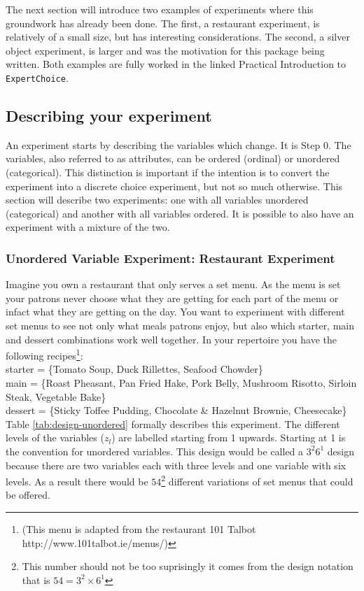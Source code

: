 \documentclass{article}
\begin{document}
The next section will introduce two examples of experiments where this groundwork has already been done.
The first, a restaurant experiment, is relatively of a small size, but has interesting considerations.
The second, a silver object experiment, is larger and was the motivation for this package being written.
Both examples are fully worked in the linked Practical Introduction to \texttt{ExpertChoice}.

\subsection{Describing your experiment}
An experiment starts by describing the variables which change.
It is Step 0.
The variables, also referred to as attributes, can be ordered (ordinal) or unordered (categorical).
This distinction is important if the intention is to convert the experiment into a discrete choice experiment, but not so much otherwise.
This section will describe two experiments: one with all variables unordered (categorical) and another with all variables ordered.
It is possible to also have an experiment with a mixture of the two.

\subsubsection{Unordered Variable Experiment: Restaurant Experiment}

Imagine you own a restaurant that only serves a set menu.
As the menu is set your patrons never choose what they are getting for each part of the menu or infact what they are getting on the day.
You want to experiment with different set menus to see not only what meals patrons enjoy, but also which starter, main and dessert combinations work well together.
In your repertoire you have the following recipes\footnote{(This menu is adapted from the restaurant 101 Talbot http://www.101talbot.ie/menus/)
}:\\

starter = \{Tomato Soup, Duck Rillettes, Seafood Chowder\} \\
main = \{Roast Pheasant, Pan Fried Hake, Pork Belly, Mushroom Risotto, Sirloin Steak, Vegetable Bake\} \\
dessert = \{Sticky Toffee Pudding, Chocolate \& Hazelnut Brownie, Cheesecake\} \\

Table \ref{tab:design-unordered} formally describes this experiment.
The different levels of the variables ($z_l$) are labelled starting from 1 upwards.
Starting at 1 is the convention for unordered variables.
This design would be called a $3^2 6^1$ design because there are two variables each with three levels and one variable with six levels.
As a result there would be $54$\footnote{This number should not be too suprisingly it comes from the design notation that is $54 = 3^2\times 6^1$} different variations of set menus that could be offered.
\end{document}
